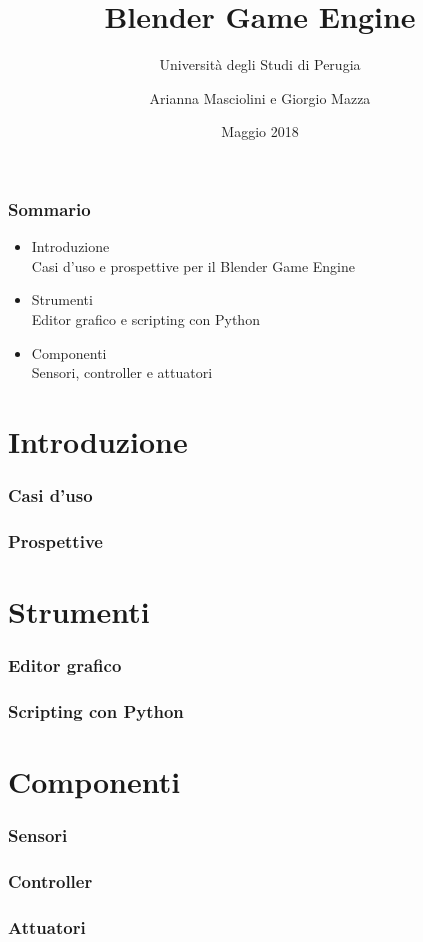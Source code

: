 \documentclass{beamer}
\title{Blender Game Engine}
\subtitle{Università degli Studi di Perugia}
\author{Arianna Masciolini e Giorgio Mazza}
\institute{UniPG}
\date{Maggio 2018}
\begin{document}
	\setcounter{showProgressBar}{0}
	\setcounter{showSlideNumbers}{0}

	\frame{\titlepage}
	\begin{frame}
		\frametitle{Sommario}
		\begin{itemize}
			\item Introduzione \\ {\footnotesize\hspace{1em} Casi d'uso e prospettive per il Blender Game Engine}
			\item Strumenti \\ {\footnotesize\hspace{1em} Editor grafico e scripting con Python}
			\item Componenti \\ {\footnotesize\hspace{1em} Sensori, controller e attuatori}
		\end{itemize}
	\end{frame}

	\setcounter{framenumber}{0}
	\setcounter{showProgressBar}{1}
	\setcounter{showSlideNumbers}{1}
	\section{Introduzione}
		\begin{frame}
			\frametitle{Casi d'uso}
		\end{frame}
		\begin{frame}
			\frametitle{Prospettive}
		\end{frame}
	
	\section{Strumenti}
		\begin{frame}
			\frametitle{Editor grafico}
		\end{frame}
		\begin{frame}
			\frametitle{Scripting con Python}
		\end{frame}	
	
	\section{Componenti}
		\begin{frame}
			\frametitle{Sensori}
		\end{frame}
		\begin{frame}
			\frametitle{Controller}
		\end{frame}
		\begin{frame}
			\frametitle{Attuatori}
		\end{frame}
\end{document}
